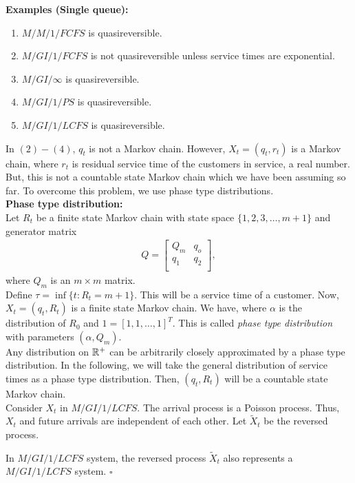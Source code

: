 \documentclass[all-lectures.tex]{subfiles}
\newcommand*{\QEDB}{\hfill\ensuremath{\square}}%
\begin{document}
\textbf{Examples (Single queue):}
\begin{enumerate}[label=(\arabic*)]
\item $M/M/1/FCFS$ is quasireversible.
\item $M/GI/1/FCFS$ is not quasireversible unless service times are exponential.
\item $M/GI/\infty$ is quasireversible.
\item $M/GI/1/PS$ is quasireversible.
\item $M/GI/1/LCFS$ is quasireversible.
\end{enumerate}
In $(2)-(4)$, $q_t$ is not a Markov chain. However, $X_t = (q_t,r_t)$ is a Markov chain, where $r_t$ is residual service time of the customers in service, a real number. But, this is not a countable state Markov chain which we have been assuming so far. To overcome this problem, we use phase type distributions. \\
\textbf{Phase type distribution:}\\
Let $R_t$ be a finite state Markov chain with state space $\{1,2,3, \dots, m+1\}$ and generator matrix
\begin{align*}
	Q = 
\begin{bmatrix}
	Q_m      & q_o \\
	q_1      & q_2 \\	
\end{bmatrix},
\end{align*}
where $Q_m$ is an $m \times m$ matrix. \\
\indent Define $\tau = \inf\{t: R_t = m+1\}$. This will be a service time of a customer. Now, $X_t = (q_t,R_t)$ is a finite state Markov chain. We have,
where $\alpha$ is the distribution of $R_0$ and $1 = [1,1,\dots,1]^T$. This is called \textit{phase type distribution }with parameters $(\alpha,Q_m)$.\\
\indent  Any distribution on $\mathbb{R}^+$ can be arbitrarily closely approximated by a phase type distribution. In the following, we will take the general distribution of service times as a phase type distribution. Then, $(q_t,R_t)$ will be a countable state Markov chain.\\
\indent Consider $X_t$ in $M/GI/1/LCFS$.  The arrival process is a Poisson process. Thus, $X_t$ and future arrivals are independent of each other. Let $\tilde{X}_t$ be the reversed process. 
\begin{prop}
In $M/GI/1/LCFS$ system, the reversed process $\tilde{X}_t$ also represents a $M/GI/1/LCFS$ system. \QEDB
\end{prop}
\end{document}

